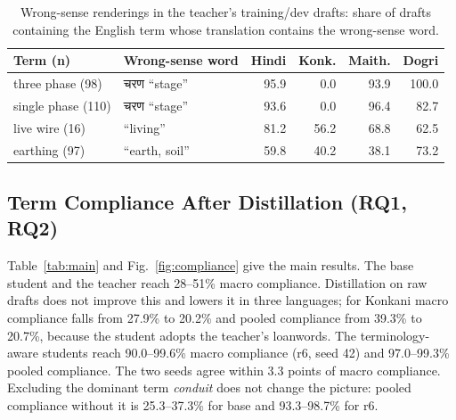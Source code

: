 \documentclass[conference]{IEEEtran}
\newcommand{\dev}[1]{{\devfont #1}}
\begin{document}
\begin{table}[t]
\caption{Wrong-sense renderings in the teacher's training/dev drafts: share of drafts containing the English term whose translation contains the wrong-sense word.}
\label{tab:wrongsense}
\centering
\footnotesize
\setlength{\tabcolsep}{4pt}
\begin{tabular}{@{}llrrrr@{}}
\toprule
Term (n) & Wrong-sense word & Hindi & Konk. & Maith. & Dogri \\
\midrule
three phase (98) & \dev{चरण} ``stage'' & 95.9 & 0.0 & 93.9 & 100.0 \\
single phase (110) & \dev{चरण} ``stage'' & 93.6 & 0.0 & 96.4 & 82.7 \\
live wire (16) & ``living'' & 81.2 & 56.2 & 68.8 & 62.5 \\
earthing (97) & ``earth, soil'' & 59.8 & 40.2 & 38.1 & 73.2 \\
\bottomrule
\end{tabular}
\end{table}

\subsection{Term Compliance After Distillation (RQ1, RQ2)}
Table~\ref{tab:main} and Fig.~\ref{fig:compliance} give the main results. The base student and the teacher reach 28--51\% macro compliance. Distillation on raw drafts does not improve this and lowers it in three languages; for Konkani macro compliance falls from 27.9\% to 20.2\% and pooled compliance from 39.3\% to 20.7\%, because the student adopts the teacher's loanwords. The terminology-aware students reach 90.0--99.6\% macro compliance (r6, seed 42) and 97.0--99.3\% pooled compliance. The two seeds agree within 3.3 points of macro compliance. Excluding the dominant term \emph{conduit} does not change the picture: pooled compliance without it is 25.3--37.3\% for base and 93.3--98.7\% for r6.
\end{document}
